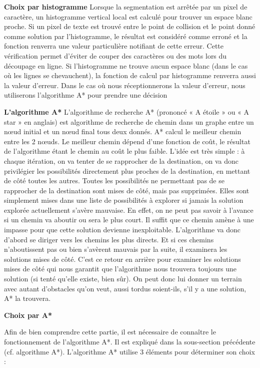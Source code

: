 \documentclass[12pt,a4paper]{article}
\begin{document}
\bigbreak\textbf{Choix par histogramme}\bigbreak
Lorsque la segmentation est arrêtée par un pixel de caractère, un histogramme vertical local est calculé pour trouver un espace blanc proche.\bigbreak
Si un pixel de texte est trouvé entre le point de collision et le point donné comme solution par l’histogramme, le résultat est considéré comme erroné et la fonction renverra une valeur particulière notifiant de cette erreur. Cette vérification permet d’éviter de couper des caractères ou des mots lors du découpage en ligne.\bigbreak
Si l’histogramme ne trouve aucun espace blanc (dans le cas où les lignes se chevauchent), la fonction de calcul par histogramme renverra aussi la valeur d’erreur.\bigbreak
Dans le cas où nous réceptionnerons la valeur d’erreur, nous utiliserons l’algorithme A* pour prendre une décision

\newpage\textbf{L'algorithme A*}\bigbreak
L’algorithme de recherche A* (prononcé « A étoile » ou « A star » en anglais) est algorithme de recherche de chemin dans un graphe entre un nœud initial et un nœud final tous deux donnés. A* calcul le meilleur chemin entre les 2 nœuds. Le meilleur chemin dépend d’une fonction de coût, le résultat de l’algorithme étant le chemin au coût le plus faible.\bigbreak
L'idée est très simple : à chaque itération, on va tenter de se rapprocher de la destination, on va donc privilégier les possibilités directement plus proches de la destination, en mettant de côté toutes les autres.\bigbreak
Toutes les possibilités ne permettant pas de se rapprocher de la destination sont mises de côté, mais pas supprimées. Elles sont simplement mises dans une liste de possibilités à explorer si jamais la solution explorée actuellement s'avère mauvaise. En effet, on ne peut pas savoir à l'avance si un chemin va aboutir ou sera le plus court. Il suffit que ce chemin amène à une impasse pour que cette solution devienne inexploitable.\bigbreak
L'algorithme va donc d'abord se diriger vers les chemins les plus directs. Et si ces chemins n'aboutissent pas ou bien s'avèrent mauvais par la suite, il examinera les solutions mises de côté. C'est ce retour en arrière pour examiner les solutions mises de côté qui nous garantit que l'algorithme nous trouvera toujours une solution (si tenté qu'elle existe, bien sûr).\bigbreak
On peut donc lui donner un terrain avec autant d'obstacles qu'on veut, aussi tordus soient-ils, s'il y a une solution, A* la trouvera.\bigbreak

\bigbreak\textbf{Choix par A*}\bigbreak

Afin de bien comprendre cette partie, il est nécessaire de connaître le fonctionnement de l'algorithme A*. Il est expliqué dans la sous-section précédente (cf. algorithme A*).\bigbreak
L’algorithme A* utilise 3 éléments pour déterminer son choix :
\end{document}
